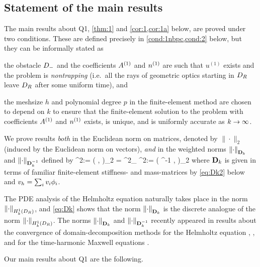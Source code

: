 \subsection{Statement of the main results}\label{sec:main}
The main results about Q1, \cref{thm:1} and \cref{cor:1,cor:1a} below, are proved under two conditions. These are defined precisely in \cref{cond:1nbpc,cond:2} below, but they can be informally stated as 
\bit
\item the obstacle $D_{-}$ and the coefficients ${A}^{(1)}$ and ${n}^{(1)}$ are such that $u^{(1)}$ exists and the problem is \emph{nontrapping} (i.e.~all the rays of geometric optics starting in $D_{R}$ leave $D_{R}$ after some uniform time), and
\item the meshsize $h$ and polynomial degree $p$ in the finite-element method are chosen to depend on $k$ to ensure that the 
finite-element solution to the problem with coefficients ${A}^{(1)}$ and ${n}^{(1)}$ exists, is unique, and 
is uniformly accurate as $k\rightarrow \infty$. 
\eit 

We prove results \emph{both} in the Euclidean norm on matrices, denoted by $\|\cdot\|_2$ (induced by the Euclidean norm on vectors), \emph{and} in the weighted norms $\NDmatk{\cdot}$ and $\NDmatkI{\cdot}$ defined by 
\beq\label{eq:Dk}
\NDmatk{\bv}^2:= \big( \Dmatk \bv, \bv\big)_2 = %
^2_{\HokDR}
\quad \tand
\quad \NDmatkI{\bv}^2:= \big( \Dmatk^{-1} \bv, \bv\big)_2 %
\eeq
where $\mathbf{D}_{k}$ is given in terms of familiar finite-element stiffness- and mass-matrices by \cref{eq:Dk2} below and $v_{h} =\sum_i v_{i} \phi_{i}$.

The PDE analysis of the Helmholtz equation naturally takes place in the norm $\NHokDR{\cdot}$, and \cref{eq:Dk} shows that the norm $\NDmatk{\cdot}$ is
the discrete analogue of the norm $\NHokDR{\cdot}$. %
The norms $\NDmatk{\cdot}$ and $\NDmatkI{\cdot}$ recently appeared in results about the convergence of domain-decomposition methods %
for the Helmholtz equation \cite{GrSpVa:17}, \cite{GrSpZo:18}, and for the time-harmonic Maxwell equations \cite{BoDoGrSpTo:19}. 

Our main results about Q1 are the following.

